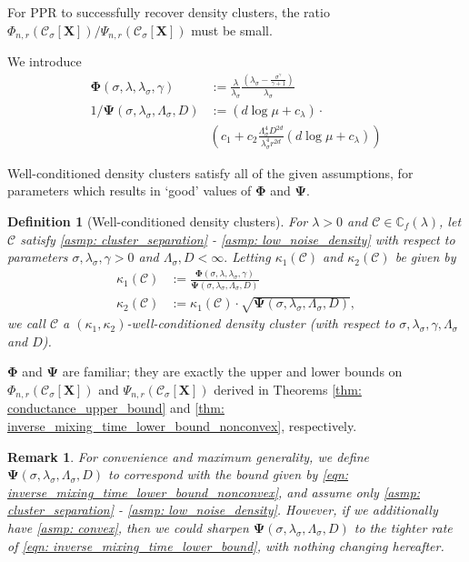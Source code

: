 \documentclass{article}
\newcommand{\1}{\mathbf{1}}
\newcommand{\Phibf}{\mathbf{\Phi}}
\newcommand{\Psibf}{\mathbf{\Psi}}
\newcommand{\Xbf}{\mathbf{X}}
\newcommand{\Cbb}{\mathbb{C}}
\newcommand{\Cset}{\mathcal{C}}
\newcommand{\Csig}{\Cset_{\sigma}}
\theoremstyle{aldenthm}
\newtheorem{definition}{Definition}
\theoremstyle{aldenrmrk}
\newtheorem{remark}{Remark}
\begin{document}
For PPR to successfully recover density clusters, the ratio $\Phi_{n,r}(\Csig[\Xbf])/\Psi_{n,r}(\Csig[\Xbf])$ must be small. 

We introduce
\begin{align*}
\mathbf{\Phi}(\sigma, \lambda,\lambda_{\sigma},\gamma) & := \frac{\lambda}{\lambda_{\sigma}} \frac{(\lambda_{\sigma} - \frac{\sigma^{\gamma}}{\gamma+1})}{\lambda_{\sigma}} \\
1 / \mathbf{\Psi}(\sigma, \lambda_{\sigma}, \Lambda_{\sigma}, D) & := \left(d \log \mu + c_{\lambda} \right) \cdot \nonumber \\ 
& \left(c_1 + c_2 \frac{\Lambda_{\sigma}^4D^{2d}}{\lambda_{\sigma}^4r^{2d}}\left(d \log \mu + c_{\lambda}\right)\right)
\end{align*}

Well-conditioned density clusters satisfy all of the given assumptions, for parameters which results in `good' values of $\Phibf$ and $\Psibf$.
\begin{definition}[Well-conditioned density clusters]
	For $\lambda > 0$ and $\Cset \in \Cbb_f(\lambda)$, let $\Cset$ satisfy \ref{asmp: cluster_separation} - \ref{asmp: low_noise_density} with respect to parameters $\sigma, \lambda_{\sigma}, \gamma > 0$ and $\Lambda_{\sigma}, D < \infty.$ Letting $\kappa_1(\Cset)$ and $\kappa_2(\Cset)$ be given by
	\begin{align*}
	\kappa_1(\Cset) & := \frac{\mathbf{\Phi}(\sigma, \lambda,\lambda_{\sigma},\gamma)}{\mathbf{\Psi}(\sigma, \lambda_{\sigma}, \Lambda_{\sigma}, D)} \\
	\kappa_2(\Cset) & := \kappa_1(\Cset) \cdot \sqrt{\mathbf{\Psi}(\sigma, \lambda_{\sigma}, \Lambda_{\sigma}, D)},
	\end{align*}
	we call $\Cset$ a \textrm{$(\kappa_1, \kappa_2)$-well-conditioned density cluster (with respect to $\sigma, \lambda_{\sigma}, \gamma, \Lambda_{\sigma}$ and $D$).}
\end{definition}

$\Phibf$ and $\Psibf$ are familiar; they are exactly the upper and lower bounds on $\Phi_{n,r}(\Csig[\Xbf])$ and $\Psi_{n,r}(\Csig[\Xbf])$ derived in Theorems \ref{thm: conductance_upper_bound} and \ref{thm: inverse_mixing_time_lower_bound_nonconvex}, respectively.

\begin{remark}
	For convenience and maximum generality, we define $\mathbf{\Psi}(\sigma, \lambda_{\sigma}, \Lambda_{\sigma}, D)$ to correspond with the bound given by \eqref{eqn: inverse_mixing_time_lower_bound_nonconvex}, and assume only \ref{asmp: cluster_separation} - \ref{asmp: low_noise_density}. However, if we additionally have \ref{asmp: convex}, then we could sharpen $\mathbf{\Psi}(\sigma, \lambda_{\sigma}, \Lambda_{\sigma}, D)$ to the tighter rate of \eqref{eqn: inverse_mixing_time_lower_bound}, with nothing changing hereafter. 
\end{remark}
\end{document}
